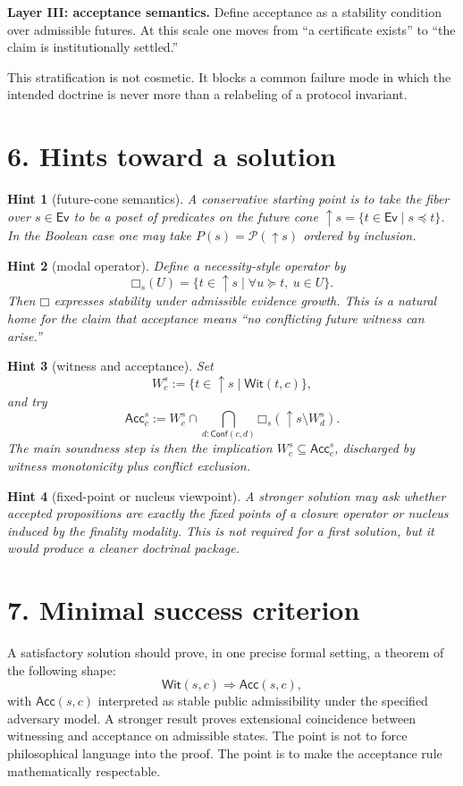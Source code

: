 \documentclass[11pt]{article}
\newtheorem{hint}{Hint}
\newcommand{\Pow}{\mathcal{P}}
\newcommand{\Up}[1]{\uparrow\!#1}
\newcommand{\Acc}{\mathsf{Acc}}
\newcommand{\Wit}{\mathsf{Wit}}
\newcommand{\Conf}{\mathsf{Conf}}
\newcommand{\Boxm}{\mathord{\Box}}
\newcommand{\Ev}{\mathsf{Ev}}
\begin{document}
\textbf{Layer III: acceptance semantics.} Define acceptance as a stability condition over admissible futures. At this scale one moves from ``a certificate exists'' to ``the claim is institutionally settled.''

This stratification is not cosmetic. It blocks a common failure mode in which the intended doctrine is never more than a relabeling of a protocol invariant.

\section*{6. Hints toward a solution}
\begin{hint}[future-cone semantics]
A conservative starting point is to take the fiber over $s\in \Ev$ to be a poset of predicates on the future cone $\Up{s}=\{t\in \Ev\mid s\preceq t\}$. In the Boolean case one may take $P(s)=\Pow(\Up{s})$ ordered by inclusion.
\end{hint}

\begin{hint}[modal operator]
Define a necessity-style operator by
\[
\Boxm_s(U)=\{t\in \Up{s}\mid \forall u\succeq t,\ u\in U\}.
\]
Then $\Boxm$ expresses stability under admissible evidence growth. This is a natural home for the claim that acceptance means ``no conflicting future witness can arise.''
\end{hint}

\begin{hint}[witness and acceptance]
Set
\[
W_c^s := \{t\in \Up{s}\mid \Wit(t,c)\},
\]
and try
\[
\Acc_c^s := W_c^s \cap \bigcap_{d:\Conf(c,d)} \Boxm_s(\Up{s}\setminus W_d^s).
\]
The main soundness step is then the implication $W_c^s\subseteq \Acc_c^s$, discharged by witness monotonicity plus conflict exclusion.
\end{hint}

\begin{hint}[fixed-point or nucleus viewpoint]
A stronger solution may ask whether accepted propositions are exactly the fixed points of a closure operator or nucleus induced by the finality modality. This is not required for a first solution, but it would produce a cleaner doctrinal package.
\end{hint}

\section*{7. Minimal success criterion}
A satisfactory solution should prove, in one precise formal setting, a theorem of the following shape:
\[
\Wit(s,c) \Longrightarrow \Acc(s,c),
\]
with $\Acc(s,c)$ interpreted as stable public admissibility under the specified adversary model. A stronger result proves extensional coincidence between witnessing and acceptance on admissible states. The point is not to force philosophical language into the proof. The point is to make the acceptance rule mathematically respectable.
\end{document}

